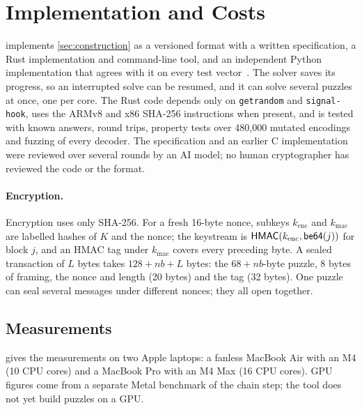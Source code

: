 \section{Implementation and Costs}\label{sec:costs}\label{sec:impl}\label{sec:params}

\leanseal implements \cref{sec:construction} as a versioned format with a written specification, a Rust implementation and command-line tool, and an independent Python implementation that agrees with it on every test vector~\cite{leanSealRepo}. The solver saves its progress, so an interrupted solve can be resumed, and it can solve several puzzles at once, one per core. The Rust code depends only on \texttt{getrandom} and \texttt{signal-hook}, uses the ARMv8 and x86 SHA-256 instructions when present, and is tested with known answers, round trips, property tests over 480,000 mutated encodings and fuzzing of every decoder. The specification and an earlier C implementation were reviewed over several rounds by an AI model; no human cryptographer has reviewed the code or the format.

\paragraph{Encryption.}
Encryption uses only SHA-256. For a fresh 16-byte nonce, subkeys $k_{\mathrm{enc}}$ and $k_{\mathrm{mac}}$ are labelled hashes of $K$ and the nonce; the keystream is $\mathsf{HMAC}(k_{\mathrm{enc}}, \mathsf{be64}(j))$ for block $j$, and an HMAC tag under $k_{\mathrm{mac}}$ covers every preceding byte. A sealed transaction of $L$ bytes takes $128 + nb + L$ bytes: the $68 + nb$-byte puzzle, 8 bytes of framing, the nonce and length (20 bytes) and the tag (32 bytes). One puzzle can seal several messages under different nonces; they all open together.

\subsection{Measurements}\label{sec:measurements}

 gives the measurements on two Apple laptops: a fanless MacBook Air with an M4 (10 CPU cores) and a MacBook Pro with an M4 Max (16 CPU cores). GPU figures come from a separate Metal benchmark of the chain step; the tool does not yet build puzzles on a GPU.

